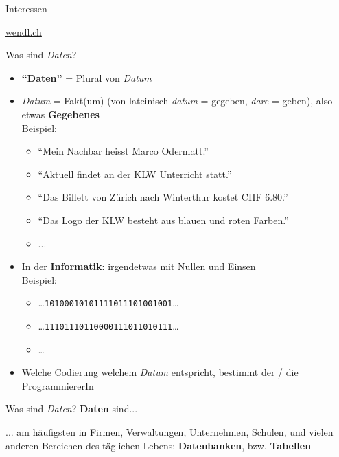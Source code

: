 \begin{frame}{Interessen}
\begin{center}
\href{https://wendl.ch}{wendl.ch}
\end{center}
\end{frame}

\begin{frame}[fragile]{Was sind \textit{Daten}?}
    \begin{itemize}[<+->]
      \item \textbf{``Daten''} = Plural von \textit{Datum}
      \item \textit{Datum} = Fakt(um) (von lateinisch \textit{datum} = gegeben, \textit{dare} = geben), also etwas \textbf{Gegebenes}\\
            Beispiel:
            \begin{itemize}
              \item ``Mein Nachbar heisst Marco Odermatt.''
              \item ``Aktuell findet an der KLW Unterricht statt.''
              \item ``Das Billett von Zürich nach Winterthur kostet CHF 6.80.''
              \item ``Das Logo der KLW besteht aus blauen und roten Farben.''
              \item ...
            \end{itemize}
      \item In der \textbf{Informatik}: irgendetwas mit Nullen und Einsen\\
            Beispiel:
            \begin{itemize}
              \item \ldots\verb|10100010101111011101001001|\ldots
              \item \ldots\verb|11101110110000111011010111|\ldots
              \item \ldots
            \end{itemize}
      \item Welche Codierung welchem \textit{Datum} entspricht, bestimmt der / die ProgrammiererIn
    \end{itemize}
\end{frame}
\begin{frame}[fragile]{Was sind \textit{Daten}?}
  \textbf{Daten} sind...\\\hspace{0.5cm}

  ... am häufigsten in Firmen, Verwaltungen, Unternehmen, Schulen, und vielen anderen Bereichen des täglichen Lebens: \textbf{Datenbanken}, bzw. \textbf{Tabellen}
\end{frame}


